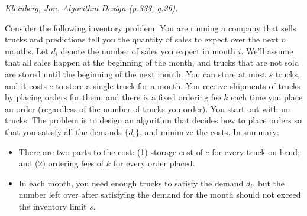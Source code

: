 \documentclass[solutionorbox,answers]{exam}
\begin{document}
\begin{questions}

\newpage

\question \textit{Kleinberg, Jon. Algorithm Design (p.333, q.26).} 

Consider the following inventory problem. You are running a company that sells trucks and predictions tell you the quantity of sales to expect over the next $n$ months. Let $d_i$ denote the number of sales you expect in month $i$. We'll assume that all sales happen at the beginning of the month, and trucks that are not sold are stored until the beginning of the next month. You can store at most $s$ trucks, and it costs $c$ to store a single truck for a month. You receive shipments of trucks by placing orders for them, and there is a fixed ordering fee $k$ each time you place an order (regardless of the number of trucks you order). You start out with no trucks. The problem is to design an algorithm that decides how to place orders so that you satisfy all the demands $\{d_i\}$, and minimize the costs. In summary:
\begin{itemize}
\item There are two parts to the cost: (1) storage cost of $c$ for every truck on hand; and (2) ordering fees of $k$ for every order placed.
\item In each month, you need enough trucks to satisfy the demand $d_i$, but the number left over after satisfying the demand for the month should not exceed the inventory limit $s$.
\end{itemize}


\end{questions}
\end{document}
